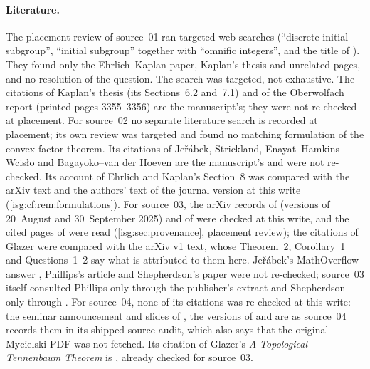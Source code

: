\documentclass[11pt]{article}
\theoremstyle{definition}
\theoremstyle{remark}
\begin{document}
\paragraph{Literature.} The placement review of source~01 ran targeted web
searches (``discrete initial subgroup'', ``initial subgroup'' together
with ``omnific integers'', and the title of \cite{EK}). They found only
the Ehrlich--Kaplan paper, Kaplan's thesis and unrelated pages, and no
resolution of the question. The search was targeted, not exhaustive. The
citations of Kaplan's thesis (its Sections~6.2 and~7.1) and of the
Oberwolfach report (printed pages 3355--3356) are the manuscript's; they
were not re-checked at placement. For source~02 no separate literature
search is recorded at placement; its own review was targeted and found no
matching formulation of the convex-factor theorem. Its citations of
Je\v r\'abek, Strickland, Enayat--Hamkins--Wcis\l o and Bagayoko--van der
Hoeven are the manuscript's and were not re-checked. Its account of
Ehrlich and Kaplan's Section~8 was compared with the arXiv text and the
authors' text of the journal version at this write
(\cref{isg:cf:rem:formulations}).
For source~03, the arXiv records of \cite{ELV} (versions of 20~August
and 30~September 2025) and of \cite{Raffer} were checked at this write,
and the cited pages of \cite{ELV} were read
(\cref{isg:sec:provenance}, placement review); the citations of Glazer
\cite{Glazer} were compared with the arXiv v1 text, whose Theorem~2,
Corollary~1 and Questions~1--2 say what is attributed to them here.
Je\v r\'abek's MathOverflow answer \cite{JerabekMO}, Phillips's article
\cite{Phillips} and Shepherdson's paper \cite{Shepherdson} were not
re-checked; source~03 itself consulted Phillips only through the
publisher's extract and Shepherdson only through \cite{Raffer}.
For source~04, none of its citations was re-checked at this write: the
seminar announcement and slides of \cite{GlazerSS}, the versions of
\cite{FataliniSchindler,YeYuZhao,EdgarMiller,DolezalKubis,BKMM} and
\cite{Mycielski,Macintyre,Kechris} are as source~04 records them in its
shipped source audit, which also says that the original Mycielski PDF was
not fetched. Its citation of Glazer's \emph{A Topological Tennenbaum
Theorem} is \cite{Glazer}, already checked for source~03.
\end{document}
